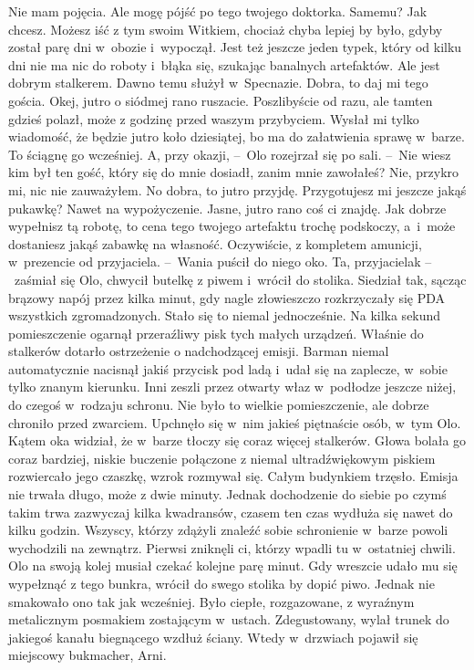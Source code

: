 \documentclass[../MAIN.tex]{subfiles}
\begin{document}
\xx Nie mam pojęcia. Ale mogę pójść po tego twojego doktorka. Samemu?
\xx Jak chcesz. Możesz iść z tym swoim Witkiem, chociaż chyba lepiej by było, gdyby został parę dni w~obozie i~wypoczął. Jest też jeszcze jeden typek, który od kilku dni nie ma nic do roboty i~błąka się, szukając banalnych artefaktów. Ale jest dobrym stalkerem. Dawno temu służył w~Specnazie.
\xx Dobra, to daj mi tego gościa.
\xx Okej, jutro o siódmej rano ruszacie. Poszlibyście od razu, ale tamten gdzieś polazł, może z godzinę przed waszym przybyciem. Wysłał mi tylko wiadomość, że będzie jutro koło dziesiątej, bo ma do załatwienia sprawę w~barze. To ściągnę go wcześniej.
\xx A, przy okazji, --~Olo rozejrzał się po sali. --~Nie wiesz kim był ten gość, który się do mnie dosiadł, zanim mnie zawołałeś?
\xx Nie, przykro mi, nic nie zauważyłem.
\xx No dobra, to jutro przyjdę. Przygotujesz mi jeszcze jakąś pukawkę? Nawet na wypożyczenie.
\xx Jasne, jutro rano coś ci znajdę. Jak dobrze wypełnisz tą robotę, to cena tego twojego artefaktu trochę podskoczy, a~i~może dostaniesz jakąś zabawkę na własność. Oczywiście, z kompletem amunicji, w~prezencie od przyjaciela. --~Wania puścił do niego oko.
\xx Ta, przyjaciela\3k --~zaśmiał się Olo, chwycił butelkę z piwem i~wrócił do stolika.
\qm
Siedział tak, sącząc brązowy napój przez kilka minut, gdy nagle złowieszczo rozkrzyczały się PDA wszystkich zgromadzonych. Stało się to niemal jednocześnie. Na kilka sekund pomieszczenie ogarnął przeraźliwy pisk tych małych urządzeń. Właśnie do stalkerów dotarło ostrzeżenie o nadchodzącej emisji. Barman niemal automatycznie nacisnął jakiś przycisk pod ladą i~udał się na zaplecze, w~sobie tylko znanym kierunku. Inni zeszli przez otwarty właz w~podłodze jeszcze niżej, do czegoś w~rodzaju schronu. Nie było to wielkie pomieszczenie, ale dobrze chroniło przed zwarciem. Upchnęło się w~nim jakieś piętnaście osób, w~tym Olo. Kątem oka widział, że w~barze tłoczy się coraz więcej stalkerów. Głowa bolała go coraz bardziej, niskie buczenie połączone z niemal ultradźwiękowym piskiem rozwiercało jego czaszkę, wzrok rozmywał się. Całym budynkiem trzęsło.
\pp
Emisja nie trwała długo, może z dwie minuty. Jednak dochodzenie do siebie po czymś takim trwa zazwyczaj kilka kwadransów, czasem ten czas wydłuża się nawet do kilku godzin. Wszyscy, którzy zdążyli znaleźć sobie schronienie w~barze powoli wychodzili na zewnątrz. Pierwsi zniknęli ci, którzy wpadli tu w~ostatniej chwili. Olo na swoją kolej musiał czekać kolejne parę minut. Gdy wreszcie udało mu się wypełznąć z tego bunkra, wrócił do swego stolika by dopić piwo. Jednak nie smakowało ono tak jak wcześniej. Było ciepłe, rozgazowane, z wyraźnym metalicznym posmakiem zostającym w~ustach. Zdegustowany, wylał trunek do jakiegoś kanału biegnącego wzdłuż ściany. Wtedy w~drzwiach pojawił się miejscowy bukmacher, Arni.
\end{document}
